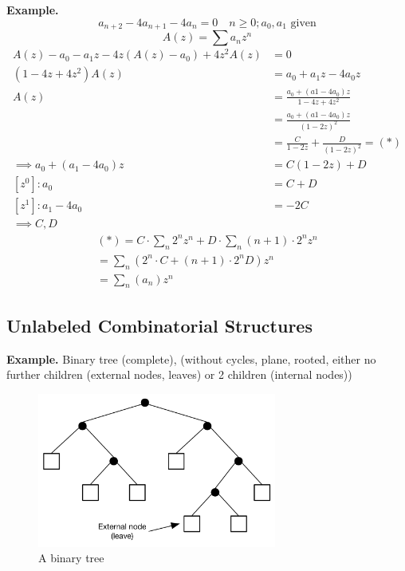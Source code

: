 \textbf{Example.}
\[
    a_{n+2} - 4 a_{n+1} - 4 a_n = 0 \quad n ≥ 0;  a_0, a_1 \text{ given}
\]
\[
    A(z) = \sum a_n z^n
\]
\begin{align*}
    A(z) - a_0 - a_1 z - 4z (A(z)-a_0) + 4z^2 A(z) &= 0 \\
    (1-4z + 4z^2) A(z) &= a_0 + a_1 z - 4a_0 z \\
    A(z) &= \frac{a_0 + (a1 - 4a_0)z}{1- 4z + 4z^2}\\
    &= \frac{a_0 + (a1 - 4a_0)z}{(1-2z)^2}\\
    &= \frac{C}{1-2z} + \frac{D}{(1-2z)^2} = (*)\\
    \implies a_0 + (a_1 - 4a_0)z &= C (1-2z) + D \\
    [z^0]: a_0 &= C+D \\
    [z^1]: a_1 - 4a_0 &= -2C \\
    \implies C, D
\end{align*}
\begin{align*}
    (*) = C \cdot \sum_n 2^n z^n + D \cdot \sum_n (n+1) \cdot 2^n z^n \\
    = \sum_n \left(2^n \cdot C + (n+1)\cdot 2^n D\right) z^n \\
    = \sum_n (a_n) z^n
\end{align*}


\subsection{Unlabeled Combinatorial Structures}

\textbf{Example.}
Binary tree (complete), (without cycles, plane, rooted, either no further children (external nodes, leaves) or 2 children (internal nodes))

\begin{figure}[htbp]
  \centering
    \includegraphics[width=0.7\textwidth]
      {02_higher_combinatorics/pics/BinaryTree}
  \caption{A binary tree}
\end{figure}

